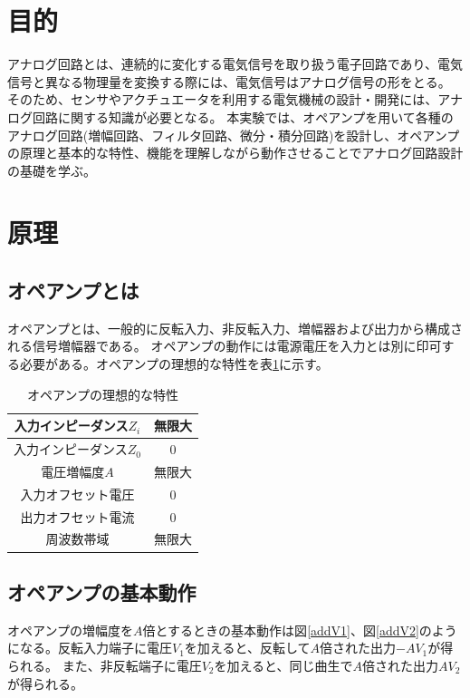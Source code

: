 \documentclass[a4paper,11pt,uplatex]{jsarticle}
\begin{document}
\section{目的}
アナログ回路とは、連続的に変化する電気信号を取り扱う電子回路であり、電気信号と異なる物理量を変換する際には、電気信号はアナログ信号の形をとる。
そのため、センサやアクチュエータを利用する電気機械の設計・開発には、アナログ回路に関する知識が必要となる。
本実験では、オペアンプを用いて各種のアナログ回路(増幅回路、フィルタ回路、微分・積分回路)を設計し、オペアンプの原理と基本的な特性、機能を理解しながら動作させることでアナログ回路設計の基礎を学ぶ。

\section{原理}
\subsection{オペアンプとは}
オペアンプとは、一般的に反転入力、非反転入力、増幅器および出力から構成される信号増幅器である。
オペアンプの動作には電源電圧を入力とは別に印可する必要がある。オペアンプの理想的な特性を表\ref{オペアンプ特性}に示す。

\begin{table}[H]
	\caption{オペアンプの理想的な特性}
	\label{オペアンプ特性}
	\begin{center}
		\begin{tabular}{|c|c|}\hline
			入力インピーダンス$Z_i$ & 無限大 \\ \hline
			入力インピーダンス$Z_0$ & 0 \\ \hline
			電圧増幅度$A$ & 無限大 \\ \hline
		  入力オフセット電圧	& 0 \\ \hline
			出力オフセット電流	& 0 \\ \hline
			周波数帯域 & 無限大 \\ \hline
		\end{tabular}
\end{center}
\end{table}

\subsection{オペアンプの基本動作}
オペアンプの増幅度を$A$倍とするときの基本動作は図\ref{addV1}、図\ref{addV2}のようになる。反転入力端子に電圧$V_1$を加えると、反転して$A$倍された出力$-AV_1$が得られる。
また、非反転端子に電圧$V_2$を加えると、同じ曲生で$A$倍された出力$AV_2$が得られる。
\end{document}
